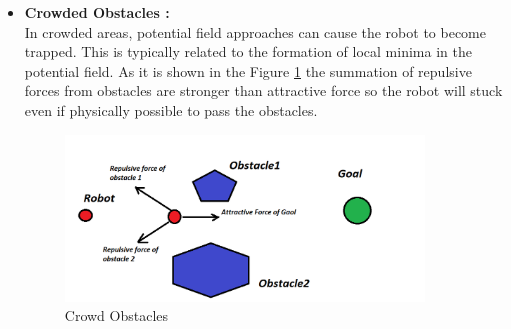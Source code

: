 \begin{itemize}
       
       \item  \textbf{ Crowded Obstacles : }\\
       In crowded areas, potential field approaches can cause the robot to become trapped. This is typically related to the formation of local minima in the potential field. As it is shown in the Figure \ref{fig:Crowd Obstacles} the summation of repulsive forces from obstacles are stronger than attractive force so the robot will stuck even if physically possible to pass the obstacles. 
\begin{figure}[H]
  \centering
  \includegraphics[width= 0.9\textwidth]{Figures/Crowd obstacles.png}
  \caption[Crowd Obstacles]{Crowd Obstacles}
   \label{fig:Crowd Obstacles}
\end{figure}


\end{itemize}
